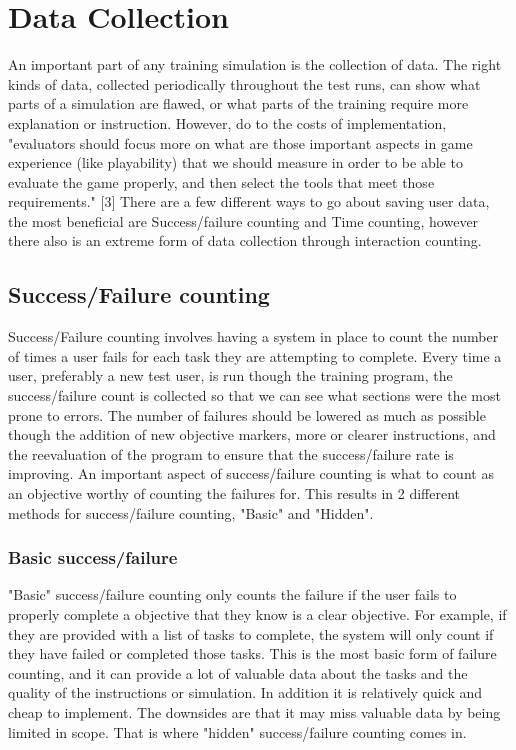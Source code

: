 \documentclass{article}
\begin{document}
\section{Data Collection}
An important part of any training simulation is the collection of data. The right kinds of data, collected periodically throughout the test runs, can show what parts of a simulation are flawed, or what parts of the training require more explanation or instruction. However, do to the costs of implementation, "evaluators should focus more on what are those important aspects in game experience (like playability) that we should measure in order to be able to evaluate the game properly, and then select the tools that meet those requirements." [3] There are a few different ways to go about saving user data, the most beneficial are Success/failure counting and Time counting, however there also is an extreme form of data collection through interaction counting.

\subsection{Success/Failure counting}
Success/Failure counting involves having a system in place to count the number of times a user fails for each task they are attempting to complete. Every time a user, preferably a new test user, is run though the training program, the success/failure count is collected so that we can see what sections were the most prone to errors. The number of failures should be lowered as much as possible though the addition of new objective markers, more or clearer instructions, and the reevaluation of the program to ensure that the success/failure rate is improving. An important aspect of success/failure counting is what to count as an objective worthy of counting the failures for. This results in 2 different methods for success/failure counting, "Basic" and "Hidden".

\subsubsection{Basic success/failure}
"Basic" success/failure counting only counts the failure if the user fails to properly complete a objective that they know is a clear objective. For example, if they are provided with a list of tasks to complete, the system will only count if they have failed or completed those tasks. This is the most basic form of failure counting, and it can provide a lot of valuable data about the tasks and the quality of the instructions or simulation. In addition it is relatively quick and cheap to implement. The downsides are that it may miss valuable data by being limited in scope. That is where "hidden" success/failure counting comes in.
\end{document}
